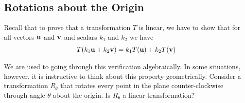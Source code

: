 \documentclass{ximera}
\renewcommand{\vec}[1]{{\bf #1}}
\newtheorem{general}{Generalization}
\begin{document}











\subsection*{Rotations about the Origin}
Recall that to prove that a transformation $T$ is linear, we have to show that for all vectors $\vec{u}$ and $\vec{v}$ and scalars $k_1$ and $k_2$ we have
\begin{equation}\label{eq:rotlintrans}
T(k_1\vec{u}+k_2\vec{v})=k_1 T(\vec{u})+k_2 T(\vec{v})
\end{equation}

We are used to going through this verification algebraically.  In some situations, however, it is instructive to think about this property geometrically.  Consider a transformation $R_{\theta}$ that rotates every point in the plane counter-clockwise through angle $\theta$ about the origin.  Is $R_{\theta}$ a linear transformation?
\end{document}

